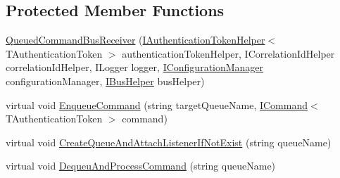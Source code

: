 \subsection*{Protected Member Functions}
\begin{DoxyCompactItemize}
\item 
\hyperlink{classCqrs_1_1Bus_1_1QueuedCommandBusReceiver_aa5158357f8e2007f06b640d4a4129781_aa5158357f8e2007f06b640d4a4129781}{Queued\+Command\+Bus\+Receiver} (\hyperlink{interfaceCqrs_1_1Authentication_1_1IAuthenticationTokenHelper}{I\+Authentication\+Token\+Helper}$<$ T\+Authentication\+Token $>$ authentication\+Token\+Helper, I\+Correlation\+Id\+Helper correlation\+Id\+Helper, I\+Logger logger, \hyperlink{interfaceCqrs_1_1Configuration_1_1IConfigurationManager}{I\+Configuration\+Manager} configuration\+Manager, \hyperlink{interfaceCqrs_1_1Bus_1_1IBusHelper}{I\+Bus\+Helper} bus\+Helper)
\item 
virtual void \hyperlink{classCqrs_1_1Bus_1_1QueuedCommandBusReceiver_ab27ff7119814cdc22bf9a5811340e4e7_ab27ff7119814cdc22bf9a5811340e4e7}{Enqueue\+Command} (string target\+Queue\+Name, \hyperlink{interfaceCqrs_1_1Commands_1_1ICommand}{I\+Command}$<$ T\+Authentication\+Token $>$ command)
\item 
virtual void \hyperlink{classCqrs_1_1Bus_1_1QueuedCommandBusReceiver_ad703e46b4a8318debac37ea747163f30_ad703e46b4a8318debac37ea747163f30}{Create\+Queue\+And\+Attach\+Listener\+If\+Not\+Exist} (string queue\+Name)
\item 
virtual void \hyperlink{classCqrs_1_1Bus_1_1QueuedCommandBusReceiver_a6e00e819b9738c694fd05815938cb433_a6e00e819b9738c694fd05815938cb433}{Dequeu\+And\+Process\+Command} (string queue\+Name)
\end{DoxyCompactItemize}
